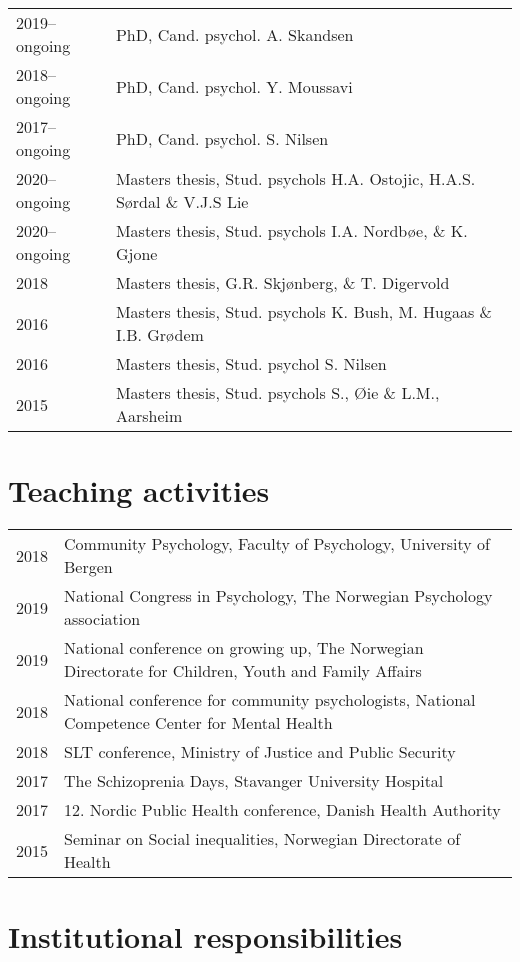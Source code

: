\documentclass[11pt,a4paper,a4paper]{article}
\begin{document}
\begin{tabular}{ll}
  2019--ongoing & PhD, Cand. psychol. A. Skandsen \\ 
  2018--ongoing & PhD, Cand. psychol. Y. Moussavi \\ 
  2017--ongoing & PhD, Cand. psychol. S. Nilsen \\ 
  2020--ongoing & Masters thesis, Stud. psychols H.A. Ostojic, H.A.S. Sørdal \& V.J.S Lie \\ 
  2020--ongoing & Masters thesis, Stud. psychols I.A. Nordbøe, \& K. Gjone \\ 
  2018 & Masters thesis, G.R. Skjønberg, \& T. Digervold \\ 
  2016 & Masters thesis, Stud. psychols K. Bush, M. Hugaas \& I.B. Grødem \\ 
  2016 & Masters thesis, Stud. psychol S. Nilsen \\ 
  2015 & Masters thesis, Stud. psychols S., Øie  \& L.M., Aarsheim \\ 
  \end{tabular}

\hypertarget{teaching-activities}{%
\section{Teaching activities}\label{teaching-activities}}

\begin{tabular}{ll}
  2018 & Community Psychology, Faculty of Psychology, University of Bergen \\ 
  2019 & National Congress in Psychology, The Norwegian Psychology association \\ 
  2019 & National conference on growing up, The Norwegian Directorate for Children, Youth and Family Affairs \\ 
  2018 & National conference for community psychologists, National Competence Center for Mental Health \\ 
  2018 & SLT conference, Ministry of Justice and Public Security \\ 
  2017 & The Schizoprenia Days, Stavanger University Hospital \\ 
  2017 & 12. Nordic Public Health conference, Danish Health Authority \\ 
  2015 & Seminar on Social inequalities, Norwegian Directorate of Health \\ 
  \end{tabular}

\hypertarget{institutional-responsibilities}{%
\section{Institutional responsibilities}\label{institutional-responsibilities}}
\end{document}
